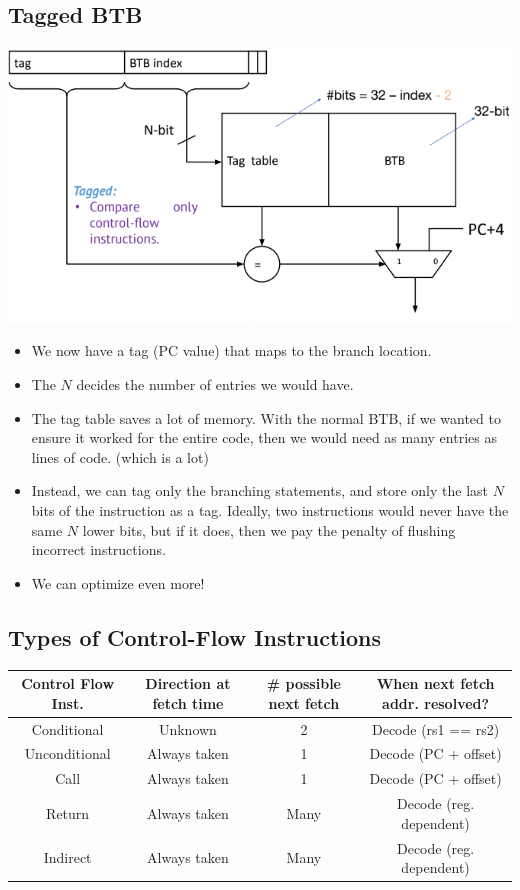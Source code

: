 \documentclass[10pt]{article}
\begin{document}
\subsection*{Tagged BTB}
\begin{center}
    \includegraphics*[scale=0.7]{W4_5.png}
\end{center}
\begin{itemize}
    \item We now have a tag (PC value) that maps to the branch location.  
    \item The $N$ decides the number of entries we would have.
    \item The tag table saves a lot of memory.  With the normal BTB, if we wanted to ensure it worked for the entire code, then we would need as many entries as lines of code.  (which is a lot)
    \item Instead, we can tag only the branching statements, and store only the last $N$ bits of the instruction as a tag.  Ideally, two instructions would never have the same $N$ lower bits, but if it does, then we pay the penalty of flushing incorrect instructions.
    \item We can optimize even more!
\end{itemize}
\subsection*{Types of Control-Flow Instructions}
\begin{tabular}{|c|c|c|c|}
    \hline
    \textbf{Control Flow Inst.} & \textbf{Direction at fetch time} & \textbf{\# possible next fetch} & \textbf{When next fetch addr. resolved?}\\
    \hline
    Conditional & Unknown & 2 & Decode (rs1 == rs2)\\
    Unconditional & Always taken & 1 & Decode (PC + offset)\\
    Call & Always taken & 1 & Decode (PC + offset)\\
    Return & Always taken & Many & Decode (reg. dependent)\\
    Indirect & Always taken & Many & Decode (reg. dependent)\\
    \hline
\end{tabular}
\end{document}
